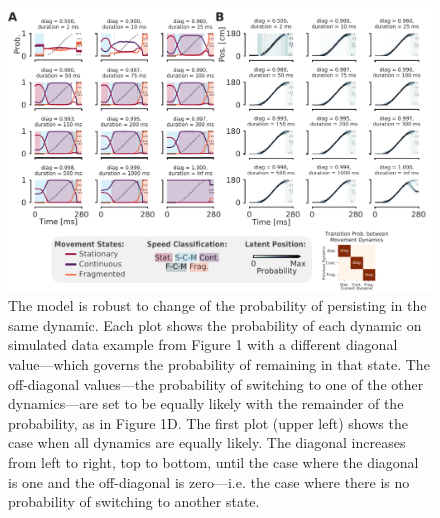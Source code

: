 \documentclass[times, twoside]{zHenriquesLab-StyleBioRxiv}
\begin{document}
\begin{figure}%
\centering
\includegraphics[width=1.0\linewidth]{figures/Figure1-supplemental1/Figure1_v3_supplemental1}
\caption{The model is robust to change of the probability of persisting in the same dynamic. Each plot shows the probability of each dynamic on simulated data example from Figure 1 with a different diagonal value---which governs the probability of remaining in that state. The off-diagonal values---the probability of switching to one of the other dynamics---are set to be equally likely with the remainder of the probability, as in Figure 1D. The first plot (upper left) shows the case when all dynamics are equally likely. The diagonal increases from left to right, top to bottom, until the case where the diagonal is one and the off-diagonal is zero---i.e. the case where there is no probability of switching to another state.}
\label{fig:Figure1-Figure supplement 1}
\end{figure}
\end{document}
